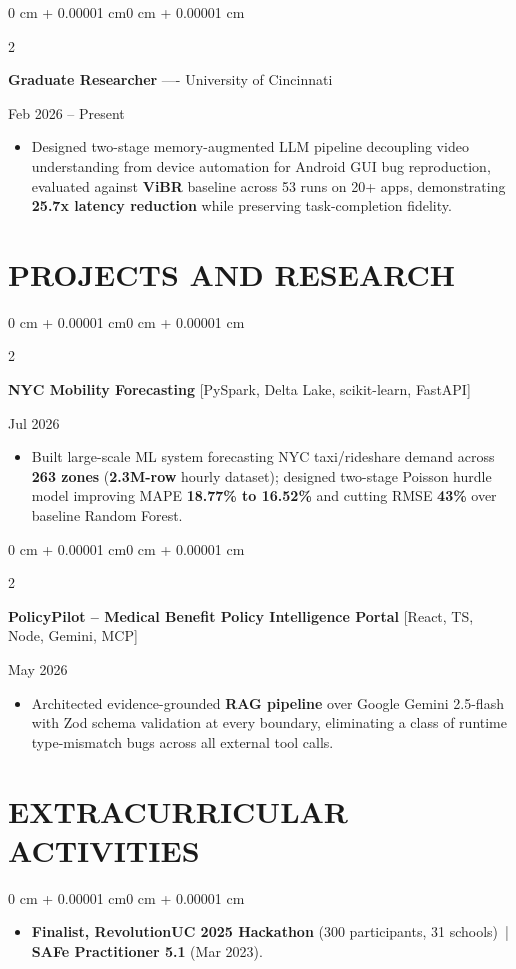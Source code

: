 \documentclass[10pt, letterpaper]{article}
\newenvironment{highlights}{
    \begin{itemize}[
        topsep=0.10 cm,
        parsep=0.06 cm,
        partopsep=0pt,
        itemsep=0.06 cm,
        leftmargin=12pt
    ]
}{
    \end{itemize}
}
\newenvironment{onecolentry}{
    \begin{adjustwidth}{0 cm + 0.00001 cm}{0 cm + 0.00001 cm}
}{
    \end{adjustwidth}
}
\newenvironment{twocolentry}[2][]{
    \onecolentry
    \def\secondColumn{#2}
    \setcolumnwidth{\fill, 4.5 cm}
    \begin{paracol}{2}
}{
    \switchcolumn \raggedleft \secondColumn
    \end{paracol}
    \endonecolentry
}
\begin{document}
\begin{twocolentry}{Feb 2026 -- Present}
\textbf{Graduate Researcher} ---- University of Cincinnati
\end{twocolentry}
\begin{highlights}
  \item Designed two-stage memory-augmented LLM pipeline decoupling video understanding from device automation for Android GUI bug reproduction, evaluated against \textbf{ViBR} baseline across 53 runs on 20+ apps, demonstrating \textbf{25.7x latency reduction} while preserving task-completion fidelity.
\end{highlights}

\section{PROJECTS AND RESEARCH}
\begin{twocolentry}{Jul 2026}
\textbf{NYC Mobility Forecasting} [PySpark, Delta Lake, scikit-learn, FastAPI]
\end{twocolentry}
\begin{highlights}
  \item Built large-scale ML system forecasting NYC taxi/rideshare demand across \textbf{263 zones} (\textbf{2.3M-row} hourly dataset); designed two-stage Poisson hurdle model improving MAPE \textbf{18.77\% to 16.52\%} and cutting RMSE \textbf{43\%} over baseline Random Forest.
\end{highlights}

\vspace{0.12 cm}

\begin{twocolentry}{May 2026}
\textbf{PolicyPilot -- Medical Benefit Policy Intelligence Portal} [React, TS, Node, Gemini, MCP]
\end{twocolentry}
\begin{highlights}
  \item Architected evidence-grounded \textbf{RAG pipeline} over Google Gemini 2.5-flash with Zod schema validation at every boundary, eliminating a class of runtime type-mismatch bugs across all external tool calls.
\end{highlights}

\section{EXTRACURRICULAR ACTIVITIES}
\begin{onecolentry}
\begin{highlights}
  \item \textbf{Finalist, RevolutionUC 2025 Hackathon} (300 participants, 31 schools) \,|\, \textbf{SAFe Practitioner 5.1} (Mar 2023).
\end{highlights}
\end{onecolentry}
\end{document}
